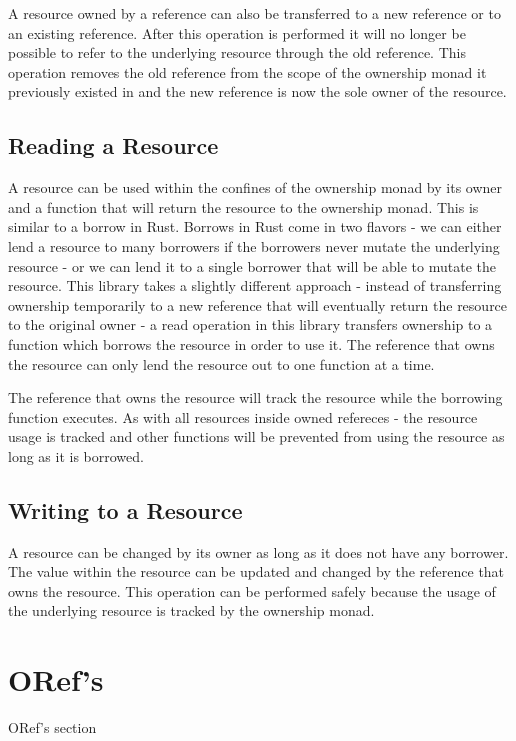 \documentclass[onehalf,11pt]{beavtex}
\begin{document}
A resource owned by a reference can also be transferred to a new reference or
to an existing reference. After this operation is performed it will no longer
be possible to refer to the underlying resource through the old reference. This
operation removes the old reference from the scope of the ownership monad it
previously existed in and the new reference is now the sole owner of the
resource.

\subsection{Reading a Resource}

A resource can be used within the confines of the ownership monad by its
owner and a function that will return the resource to the ownership monad.
This is similar to a borrow in Rust.  Borrows in Rust come in two flavors - we
can either lend a resource to many borrowers if the borrowers never mutate the
underlying resource - or we can lend it to a single borrower that will be able
to mutate the resource.
This library takes a slightly different approach - instead of transferring ownership
temporarily to a new reference that will eventually return the resource to the
original owner - a read operation in this library transfers ownership to a
function which borrows the resource in order to use it.
The reference that owns the resource can only lend the resource out to one
function at a time.

The reference that owns the resource will track the resource while the borrowing
function executes. As with all resources inside owned refereces - the resource
usage is tracked and other functions will be prevented from using the resource
as long as it is borrowed.

\subsection{Writing to a Resource}

A resource can be changed by its owner as long as it does not have any borrower.
The value within the resource can be updated and changed by the reference that
owns the resource. This operation can be performed safely because the usage
of the underlying resource is tracked by the ownership monad.

\section{ORef's}
ORef's section




{}

\end{document}
